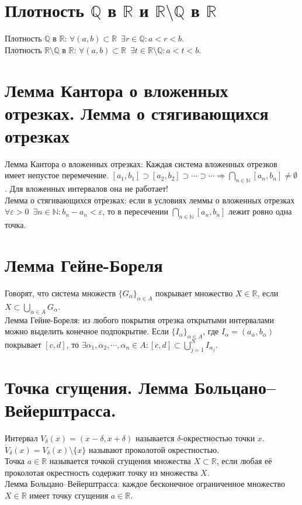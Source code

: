 \documentclass[11pt, a4paper]{article}
\def\R{\mathbb{R}}
\def\Q{\mathbb{Q}}
\def\N{\mathbb{N}}
\def\sp{\, \, \,}
\begin{document}
    \section{Плотность $\Q$ в $\R$ и $\R \setminus \Q$ в $\R$}
    Плотность $\Q$ в $\R$: $\forall (a,b) \subset \R \sp \exists r \in \Q: a < r < b$.\\
    Плотность $\R \setminus \Q$ в $\R$: $\forall (a,b) \subset \R \sp \exists t \in \R \setminus \Q : a < t < b$.

    \section{Лемма Кантора о вложенных отрезках. Лемма о стягивающихся отрезках}
    Лемма Кантора о вложенных отрезках: Каждая система вложенных отрезков имеет непустое перемечение. $ [a_1, b_1] \supset [a_2, b_2] \supset \cdots \supset \cdots \Rightarrow \bigcap_{n \in \N} [a_n, b_n] \neq \emptyset$. Для вложенных интервалов она не работает!\\
    Лемма о стягивающихся отрезках: если в условиях леммы о вложенных отрезках\\$\forall \varepsilon > 0 \sp \exists n \in \N : b_n - a_n < \varepsilon$, то в пересечении $\bigcap_{n \in \N} [a_n,b_n]$ лежит ровно одна точка.

    \section{Лемма Гейне-Бореля}
    Говорят, что система множеств $\{G_{\alpha}\}_{\alpha \in A}$ покрывает множество $X \in \R$, если $X \subset \bigcup_{\alpha \in A} G_{\alpha}$.\\
    Лемма Гейне-Бореля: из любого покрытия отрезка открытыми интервалами можно выделить конечное подпокрытие. Если $\{I_{\alpha}\}_{\alpha \in A}$, где $I_\alpha = (a_{\alpha}, b_{\alpha})$ покрывает $[c, d]$, то $\exists \alpha_1, \alpha_2, \cdots, \alpha_n \in A: [c,d] \subset \bigcup_{j=1}^N I_{\alpha_j}$.

    \section{Точка сгущения. Лемма Больцано--Вейерштрасса.}
    Интервал $V_{\delta} (x) = (x-\delta , x+\delta )$ называется $\delta$-окрестностью точки $x$.\\
    $\dot{V}_{\delta} (x) = V_{\delta} (x) \setminus \{x\}$ называют проколотой окрестностью.\\
    Точка $a \in \R$ называется точкой сгущения множества $X \subset \R$, если любая её проколотая окрестность содержит точку из множества $X$.\\
    Лемма Больцано--Вейерштрасса: каждое бесконечное ограниченное множество $X \in \R$ имеет точку сгущения $a \in \R$.
\end{document}
